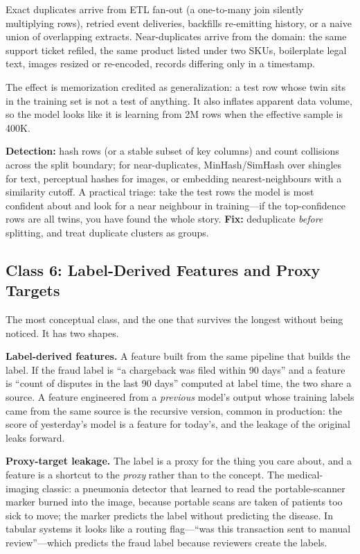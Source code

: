 Exact duplicates arrive from ETL fan-out (a one-to-many join silently multiplying rows), retried event deliveries, backfills re-emitting history, or a naive union of overlapping extracts. Near-duplicates arrive from the domain: the same support ticket refiled, the same product listed under two SKUs, boilerplate legal text, images resized or re-encoded, records differing only in a timestamp.

The effect is memorization credited as generalization: a test row whose twin sits in the training set is not a test of anything. It also inflates apparent data volume, so the model looks like it is learning from 2M rows when the effective sample is 400K.

\textbf{Detection:} hash rows (or a stable subset of key columns) and count collisions across the split boundary; for near-duplicates, MinHash/SimHash over shingles for text, perceptual hashes for images, or embedding nearest-neighbours with a similarity cutoff. A practical triage: take the test rows the model is most confident about and look for a near neighbour in training---if the top-confidence rows are all twins, you have found the whole story. \textbf{Fix:} deduplicate \emph{before} splitting, and treat duplicate clusters as groups.

\subsection{Class 6: Label-Derived Features and Proxy Targets}

The most conceptual class, and the one that survives the longest without being noticed. It has two shapes.

\textbf{Label-derived features.} A feature built from the same pipeline that builds the label. If the fraud label is ``a chargeback was filed within 90 days'' and a feature is ``count of disputes in the last 90 days'' computed at label time, the two share a source. A feature engineered from a \emph{previous} model's output whose training labels came from the same source is the recursive version, common in production: the score of yesterday's model is a feature for today's, and the leakage of the original leaks forward.

\textbf{Proxy-target leakage.} The label is a proxy for the thing you care about, and a feature is a shortcut to the \emph{proxy} rather than to the concept. The medical-imaging classic: a pneumonia detector that learned to read the portable-scanner marker burned into the image, because portable scans are taken of patients too sick to move; the marker predicts the label without predicting the disease. In tabular systems it looks like a routing flag---``was this transaction sent to manual review''---which predicts the fraud label because reviewers create the labels.


